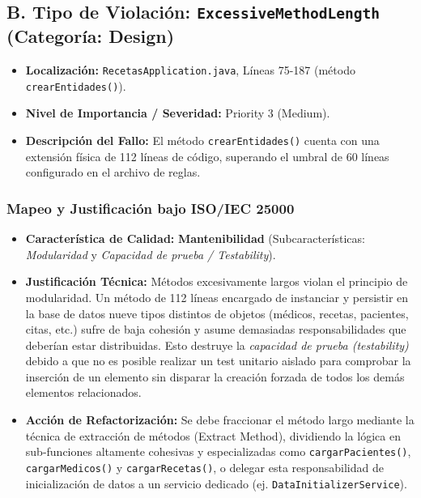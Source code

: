 \documentclass[12pt,a4paper]{article}
\begin{document}
\newpage

\subsection{B. Tipo de Violación: \texttt{ExcessiveMethodLength} (Categoría: Design)}
\begin{itemize}
    \item \textbf{Localización:} \texttt{RecetasApplication.java}, Líneas 75-187 (método \texttt{crearEntidades()}).
    \item \textbf{Nivel de Importancia / Severidad:} Priority 3 (Medium).
    \item \textbf{Descripción del Fallo:} El método \texttt{crearEntidades()} cuenta con una extensión física de 112 líneas de código, superando el umbral de 60 líneas configurado en el archivo de reglas.
\end{itemize}

\subsubsection{Mapeo y Justificación bajo ISO/IEC 25000}
\begin{itemize}
    \item \textbf{Característica de Calidad:} \textbf{Mantenibilidad} (Subcaracterísticas: \textit{Modularidad} y \textit{Capacidad de prueba / Testability}).
    \item \textbf{Justificación Técnica:} Métodos excesivamente largos violan el principio de modularidad. Un método de 112 líneas encargado de instanciar y persistir en la base de datos nueve tipos distintos de objetos (médicos, recetas, pacientes, citas, etc.) sufre de baja cohesión y asume demasiadas responsabilidades que deberían estar distribuidas. Esto destruye la \textit{capacidad de prueba (testability)} debido a que no es posible realizar un test unitario aislado para comprobar la inserción de un elemento sin disparar la creación forzada de todos los demás elementos relacionados.
    \item \textbf{Acción de Refactorización:} Se debe fraccionar el método largo mediante la técnica de extracción de métodos (Extract Method), dividiendo la lógica en sub-funciones altamente cohesivas y especializadas como \texttt{cargarPacientes()}, \texttt{cargarMedicos()} y \texttt{cargarRecetas()}, o delegar esta responsabilidad de inicialización de datos a un servicio dedicado (ej. \texttt{DataInitializerService}).
\end{itemize}
\end{document}
